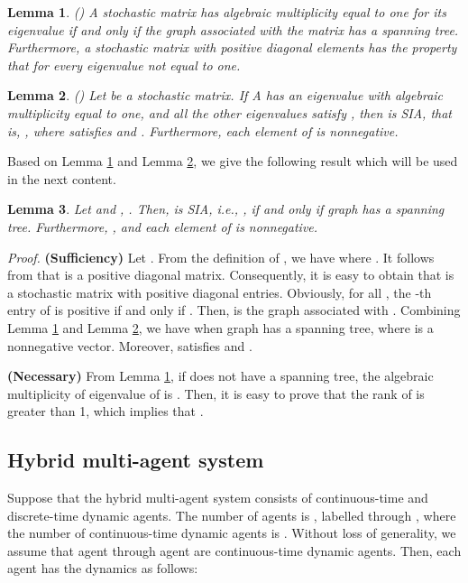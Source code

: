 \documentclass[12pt,draftcls,onecolumn]{IEEEtran}
\newtheorem{lemma}{Lemma}
\begin{document}
\begin{lemma}\label{lemma-renw-3.5}(\cite{ren05})  A stochastic matrix has algebraic multiplicity equal
to one for its eigenvalue  if and only if the graph associated
with the matrix has a spanning tree. Furthermore, a stochastic matrix
with positive diagonal elements has the property that  for every
eigenvalue not equal to one.
\end{lemma}

\begin{lemma}\label{lemma-renw-3.7}(\cite{ren05}) Let  be a stochastic matrix. If
A has an eigenvalue  with algebraic multiplicity equal to one,
and all the other eigenvalues satisfy , then  is SIA, that is,
, where  satisfies  and . Furthermore, each element of  is nonnegative.
\end{lemma}

Based on Lemma \ref{lemma-renw-3.5} and Lemma \ref{lemma-renw-3.7}, we give the following result which will be used in the next content.

\begin{lemma}\label{lemma-1}
Let  and , . Then,  is SIA, i.e., , if and only if graph  has a spanning tree. Furthermore, ,  and each element of  is nonnegative.
\end{lemma}
{\it Proof.} \textbf{(Sufficiency)} Let . From the definition of , we have  where . It follows from  that  is a positive diagonal matrix. Consequently, it is easy to obtain that  is a stochastic matrix with positive diagonal entries. Obviously, for all , the -th entry of  is positive if and only if . Then,  is the graph associated with . Combining Lemma \ref{lemma-renw-3.5} and Lemma \ref{lemma-renw-3.7}, we have when graph  has a spanning tree,  where  is a nonnegative vector. Moreover,  satisfies  and .

\textbf{(Necessary)} From Lemma \ref{lemma-renw-3.5}, if  does not have a spanning tree, the algebraic multiplicity of eigenvalue  of  is . Then, it is easy to prove that the rank of  is greater than 1, which implies that . 


\subsection{Hybrid multi-agent system}\label{s-Hybrid multi-agent systems}

Suppose that the hybrid multi-agent system consists of continuous-time and discrete-time dynamic agents. The number of agents is , labelled  through , where the number of continuous-time dynamic agents is  . Without loss of generality, we assume that agent  through agent  are continuous-time dynamic agents. Then, each agent has the dynamics as follows:
\end{document}
